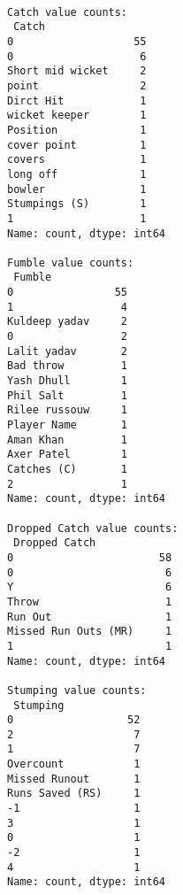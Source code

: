 \documentclass[11pt]{article}
\begin{document}
    \begin{Verbatim}[commandchars=\\\{\}]

Catch value counts:
 Catch
0                   55
0                    6
Short mid wicket     2
point                2
Dirct Hit            1
wicket keeper        1
Position             1
cover point          1
covers               1
long off             1
bowler               1
Stumpings (S)        1
1                    1
Name: count, dtype: int64

Fumble value counts:
 Fumble
0                55
1                 4
Kuldeep yadav     2
0                 2
Lalit yadav       2
Bad throw         1
Yash Dhull        1
Phil Salt         1
Rilee russouw     1
Player Name       1
Aman Khan         1
Axer Patel        1
Catches (C)       1
2                 1
Name: count, dtype: int64

Dropped Catch value counts:
 Dropped Catch
0                       58
0                        6
Y                        6
Throw                    1
Run Out                  1
Missed Run Outs (MR)     1
1                        1
Name: count, dtype: int64

Stumping value counts:
 Stumping
0                  52
2                   7
1                   7
Overcount           1
Missed Runout       1
Runs Saved (RS)     1
-1                  1
3                   1
0                   1
-2                  1
4                   1
Name: count, dtype: int64
    \end{Verbatim}
\end{document}
